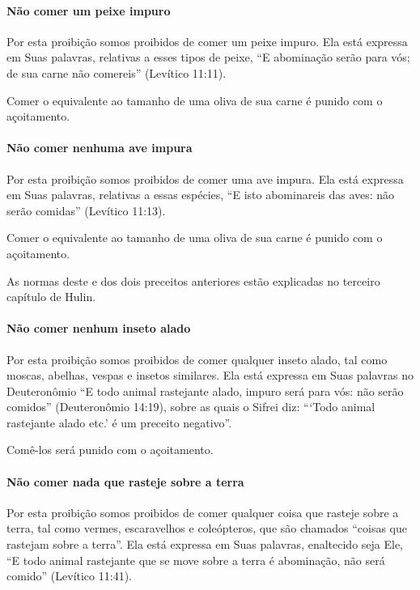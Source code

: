 \paragraph{Não comer um peixe impuro}

Por esta proibição somos proibidos de comer um peixe impuro. Ela está
expressa em Suas palavras, relativas a esses tipos de peixe, ``E
abominação serão para vós; de sua carne não comereis'' (Levítico 11:11).

Comer o equivalente ao tamanho de uma oliva de sua carne é punido com o
açoitamento.

\paragraph{Não comer nenhuma ave impura}

Por esta proibição somos proibidos de comer uma ave impura. Ela está
expressa em Suas palavras, relativas a essas espécies, ``E isto
abominareis das aves: não serão comidas'' (Levítico 11:13).

Comer o equivalente ao tamanho de uma oliva de sua carne é punido com o
açoitamento.

As normas deste e dos dois preceitos anteriores estão explicadas no
terceiro capítulo de Hulin.

\paragraph{Não comer nenhum inseto alado}

Por esta proibição somos proibidos de comer qualquer inseto alado, tal
como moscas, abelhas, vespas e insetos similares. Ela está expressa em
Suas palavras no Deuteronômio ``E todo animal rastejante alado, impuro
será para vós: não serão comidos'' (Deuteronômio 14:19), sobre as quais
o Sifrei diz: ```Todo animal rastejante alado etc.' é um preceito
negativo''.

Comê-los será punido com o açoitamento.

\paragraph{Não comer nada que rasteje sobre a terra}

Por esta proibição somos proibidos de comer qualquer coisa que rasteje
sobre a terra, tal como vermes, escaravelhos e coleópteros, que são
chamados ``coisas que rastejam sobre a terra''. Ela está expressa em
Suas palavras, enaltecido seja Ele, ``E todo animal rastejante que se
move sobre a terra é abominação, não será comido'' (Levítico 11:41).

